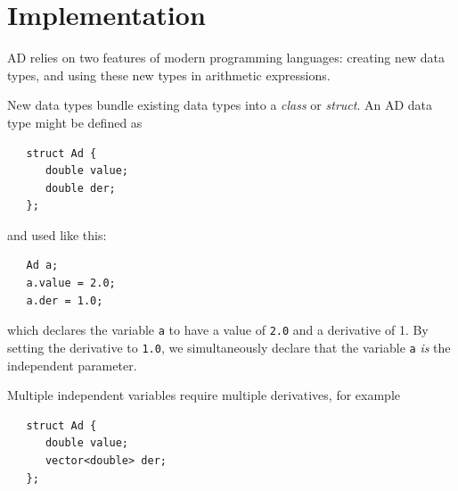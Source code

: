 \documentclass[10pt,openany,twoside]{book}
\numberwithin{equation}{section}   %
\newcommand{\Code}[1]{{\small\tt #1}}
\newcommand{\Fina}{{\normalfont\scshape Fina\:}}
\begin{document}


\section{Implementation}
AD relies on two features of modern programming languages: creating new
data types, and using these new types in arithmetic expressions.

New data types bundle existing data types into a \emph{class} or \emph{struct}.
An AD data type might be defined as
\begin{lstlisting}
   struct Ad {
      double value;
      double der;
   };
\end{lstlisting}



and used like this:
\begin{lstlisting}
   Ad a;
   a.value = 2.0;
   a.der = 1.0;
\end{lstlisting}
which declares the variable \Code{a} to have a value of \Code{2.0}
and a derivative of 1.  By setting the derivative
to \Code{1.0}, we simultaneously declare that the variable \Code{a} \emph{is}
the independent parameter.

Multiple independent variables require multiple derivatives, for example
\begin{lstlisting}
   struct Ad {
      double value;
      vector<double> der;
   };
\end{lstlisting}
\end{document}
